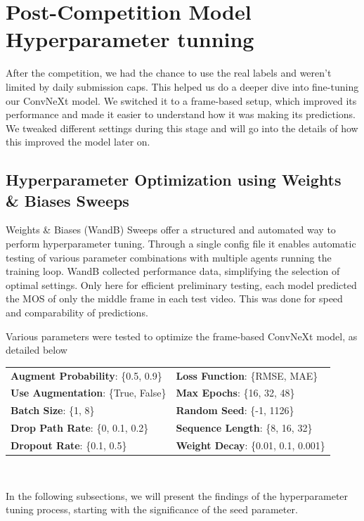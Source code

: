 \documentclass[a4paper,12pt,openright]{book}
\begin{document}
\newpage
\section{Post-Competition Model Hyperparameter tunning}
After the competition, we had the chance to use the real labels and weren't limited by daily submission caps. This helped us do a deeper dive into fine-tuning our ConvNeXt model. We switched it to a frame-based setup, which improved its performance and made it easier to understand how it was making its predictions. We tweaked different settings during this stage and will go into the details of how this improved the model later on.

\subsection{Hyperparameter Optimization using Weights \& Biases Sweeps}
Weights \& Biases (WandB) Sweeps offer a structured and automated way to perform hyperparameter tuning. Through a single config file it enables automatic testing of various parameter combinations with multiple agents running the training loop. WandB collected performance data, simplifying the selection of optimal settings. Only here for efficient preliminary testing, each model predicted the MOS of only the middle frame in each test video. This was done for speed and comparability of predictions.

Various parameters were tested to optimize the frame-based ConvNeXt model, as detailed below
\

\begin{tabular}{ll}
    \textbf{Augment Probability}: \{0.5, 0.9\} & \textbf{Loss Function}: \{RMSE, MAE\} \\
    \textbf{Use Augmentation}: \{True, False\} & \textbf{Max Epochs}: \{16, 32, 48\} \\
    \textbf{Batch Size}: \{1, 8\} & \textbf{Random Seed}: \{-1, 1126\} \\
    \textbf{Drop Path Rate}: \{0, 0.1, 0.2\} & \textbf{Sequence Length}: \{8, 16, 32\} \\
    \textbf{Dropout Rate}: \{0.1, 0.5\} & \textbf{Weight Decay}: \{0.01, 0.1, 0.001\} \\
\end{tabular}
\

In the following subsections, we will present the findings of the hyperparameter tuning process, starting with the significance of the seed parameter.
\end{document}
